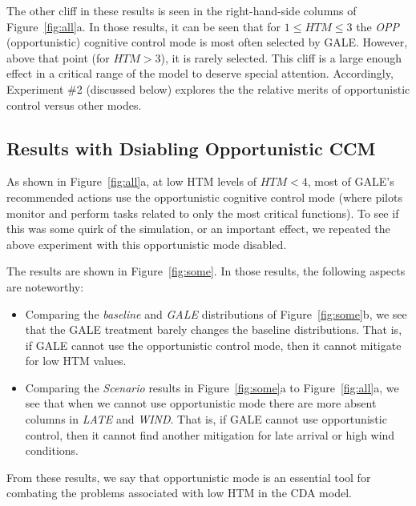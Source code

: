 \documentclass[journal]{IEEEtran}
\newcommand{\bi}{\begin{itemize}}
\newcommand{\ei}{\end{itemize}}
\newcommand{\fig}[1]{Figure~\ref{fig:#1}}
\begin{document}
The other cliff in these results is seen in the right-hand-side columns of \fig{all}a. 
In those results, it can be seen that for  $1 \le \mathit{HTM} \le 3$ the {\em OPP} (opportunistic) cognitive control mode is most often selected by GALE. 
However, above that point (for $\mathit{HTM}>3$), it is rarely selected.
This cliff is a large enough effect in  a critical range of the model to deserve special attention.
Accordingly, Experiment \#2 (discussed below) explores the the relative merits of opportunistic control versus other modes.

\subsection{Results with Dsiabling  Opportunistic CCM}
As shown in \fig{all}a, at low HTM levels of $\mathit{HTM}<4$, most of GALE's recommended actions use the opportunistic cognitive control mode (where pilots monitor and perform tasks related to only the most critical functions). 
To see if this was some quirk of the simulation, or an important effect, we repeated the above experiment with this opportunistic mode disabled.

The results are shown in \fig{some}.  
In those results, the following aspects are noteworthy:
\bi
\item Comparing the {\em baseline} and {\em GALE} distributions of  \fig{some}b, we see that the GALE treatment barely changes the baseline distributions. 
That is, if GALE cannot use the opportunistic control mode, then it cannot mitigate for low HTM values.
\item
Comparing the {\em Scenario} results in \fig{some}a to \fig{all}a, we see that when we cannot use opportunistic mode there are more absent columns in {\em LATE} and {\em WIND}.
That is, if GALE cannot use opportunistic control, then it cannot find another mitigation for late arrival or high wind conditions.
\ei
From these results, we say that opportunistic mode is an essential tool for combating the problems associated with low HTM in the CDA model.
 
\end{document}
